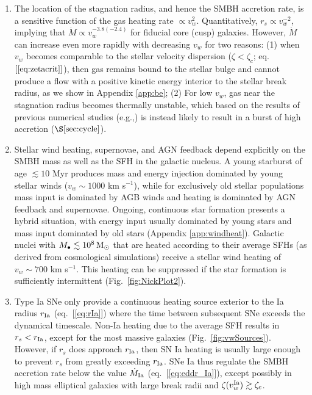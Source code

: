 \documentclass[usenatbib,fleqn]{mn2e}
\newcommand{\Mdot}{\dot{M}}
\newcommand{\rs}{r_s}
\newcommand{\Mbh}[1][]{M_{\bullet#1}}
\newcommand{\rIa}{r_{\rm Ia}}
\begin{document}
\begin{enumerate}
  \item The location of the stagnation radius, and hence the SMBH
    accretion rate, is a sensitive function of the gas heating rate
    $\propto v_w^{2}$.  Quantitatively, $\rs\propto v_w^{-2}$,
    implying that $\Mdot\propto v_w^{-3.8 (-2.4)}$ for fiducial core
    (cusp) galaxies.  However, $\Mdot$ can increase even more rapidly
    with decreasing $v_w$ for two reasons: (1) when $v_w$ becomes
    comparable to the stellar velocity dispersion ($\zeta < \zeta_c$;
    eq.~$[\ref{eq:zetacrit}]$), then gas remains bound to the stellar
    bulge and cannot produce a flow with a positive kinetic energy
    interior to the stellar break radius, as we show in Appendix
    \ref{app:be}; (2) For low $v_w$, gas near the stagnation radius
    becomes thermally unstable, which based on the results of previous
    numerical studies (e.g.,\citealt{Ciotti+10}) is instead likely to
    result in a burst of high accretion ($\S\ref{sec:cycle}$).

  \item Stellar wind heating, supernovae, and AGN feedback depend
    explicitly on the SMBH mass as well as the SFH in the galactic
    nucleus.  A young starburst of age $\lesssim 10$ Myr produces mass
    and energy injection dominated by young stellar winds ($v_w \sim
    1000$ km s$^{-1}$), while for exclusively old stellar populations
    mass input is dominated by AGB winds and heating is dominated by
    AGN feedback and supernovae.  Ongoing, continuous star formation
    presents a hybrid situation, with energy input usually dominated
    by young stars and mass input dominated by old stars (Appendix
    \ref{app:windheat}).  Galactic nuclei with $\Mbh \lesssim
    10^8\Msun$ that are heated according to their average SFHs (as
    derived from cosmological simulations) receive a stellar wind
    heating of $v_w \sim 700$ km s$^{-1}$.  This heating can be
    suppressed if the star formation is sufficiently intermittent
    (Fig.~\ref{fig:NickPlot2}).

\item Type Ia SNe only provide a continuous heating source exterior to
  the Ia radius $\rIa$ (eq.~[\ref{eq:rIa}]) where the time between
  subsequent SNe exceeds the dynamical timescale.  Non-Ia heating due
  to the average SFH results in $\rs <\rIa$, except for the most
  massive galaxies (Fig.~\ref{fig:vwSources}).  However, if $\rs$ does
  approach $\rIa$, then SN Ia heating is usually
  large enough to prevent $\rs$ from greatly exceeding $\rIa$.
  SNe Ia thus regulate the SMBH accretion rate below the value
  $\dot{M}_{\rm Ia}$ (eq.~[\ref{eq:eddr_Ia}]), except possibly in high
  mass elliptical galaxies with large break radii and $\zeta(v_w^{\rm
    Ia}) \gtrsim \zeta_c$.


\end{enumerate}
\end{document}
